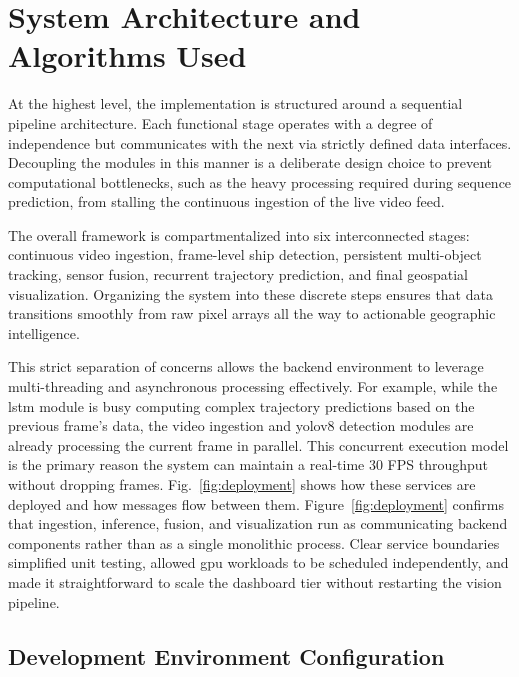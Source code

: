 \section{System Architecture and Algorithms Used}

At the highest level, the implementation is structured around a sequential pipeline architecture. Each functional stage operates with a degree of independence but communicates with the next via strictly defined data interfaces. Decoupling the modules in this manner is a deliberate design choice to prevent computational bottlenecks, such as the heavy processing required during sequence prediction, from stalling the continuous ingestion of the live video feed. 

The overall framework is compartmentalized into six interconnected stages: continuous video ingestion, frame-level ship detection, persistent multi-object tracking, sensor fusion, recurrent trajectory prediction, and final geospatial visualization. Organizing the system into these discrete steps ensures that data transitions smoothly from raw pixel arrays all the way to actionable geographic intelligence. 

\begin{reportfigblock}
This strict separation of concerns allows the backend environment to leverage multi-threading and asynchronous processing effectively. For example, while the \gls{lstm} module is busy computing complex trajectory predictions based on the previous frame's data, the video ingestion and \gls{yolov8} detection modules are already processing the current frame in parallel. This concurrent execution model is the primary reason the system can maintain a real-time 30 FPS throughput without dropping frames. Fig.~\ref{fig:deployment} shows how these services are deployed and how messages flow between them.
Figure~\ref{fig:deployment} confirms that ingestion, inference, fusion, and visualization run as communicating backend components rather than as a single monolithic process. Clear service boundaries simplified unit testing, allowed \gls{gpu} workloads to be scheduled independently, and made it straightforward to scale the dashboard tier without restarting the vision pipeline.
\end{reportfigblock}

\subsection{Development Environment Configuration}

